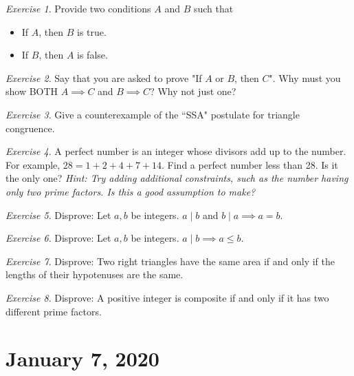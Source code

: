 \documentclass[11pt]{article}
\theoremstyle{plain}
\theoremstyle{definition}
\theoremstyle{remark}
\newtheorem{exc}{Exercise}[section]
\begin{document}
\begin{exc}
    Provide two conditions $A$ and $B$ such that
    \begin{itemize}
        \item If $A$, then $B$ is true.
        \item If $B$, then $A$ is false.
    \end{itemize}
\end{exc}
\begin{exc}
    Say that you are asked to prove "If $A$ or $B$, then $C$". Why must you show BOTH $A \implies C$ and $B \implies C$? Why not just one?
\end{exc}
\begin{exc}
    Give a counterexample of the ``SSA" postulate for triangle congruence.
\end{exc}
\begin{exc}
    A perfect number is an integer whose divisors add up to the number. For example, $28 = 1 + 2 + 4 + 7 + 14$. Find a perfect number less than 28. Is it the only one? {\it Hint: Try adding additional constraints, such as the number having only two prime factors. Is this a good assumption to make?}
\end{exc}
\begin{exc}
    Disprove: Let $a, b$ be integers. $a \mid b$ and $b \mid a \implies a = b$.
\end{exc}
\begin{exc}
    Disprove: Let $a, b$ be integers. $a \mid b \implies a \leq b$.
\end{exc}
\begin{exc}
    Disprove: Two right triangles have the same area if and only if the lengths of their hypotenuses are the same.
\end{exc}
\begin{exc}
    Disprove: A positive integer is composite if and only if it has two different prime factors.
\end{exc}

\section{January 7, 2020}
\end{document}
